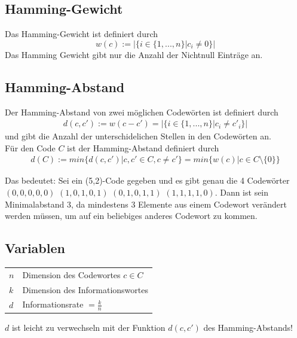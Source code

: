 \documentclass{scrartcl}
\begin{document}
\subsection{Hamming-Gewicht}

\begin{Def}
Das Hamming-Gewicht ist definiert durch
\[
w(c) := \Big| \Big\{ i \in \{ 1,...,n \} \Big| c_i \neq 0 \Big\} \Big|
\]
Das Hamming Gewicht gibt nur die Anzahl der Nichtnull Einträge an.
\end{Def}

\subsection{Hamming-Abstand}
\begin{Def}
Der Hamming-Abstand von zwei möglichen Codewörten ist definiert durch
\begin{align*}
d(c,c') := w(c - c') = \Big| \Big\{ i \in \{ 1, ..., n \} \Big| c_i \neq c'_i \Big\}\Big|
\end{align*}
und gibt die Anzahl der unterschidelichen Stellen in den Codewörten an.\\
Für den Code $C$ ist der Hamming-Abstand definiert durch
\begin{align*}
d(C) := min\Big\{ d(c, c') \Big| c, c' \in C, c \neq c' \Big\} = min \{w(c) | c \in C \setminus \{0\}\}
\end{align*}
\end{Def}

\begin{Beispiel}
Das bedeutet: Sei ein (5,2)-Code gegeben und es gibt genau die 4 Codewörter $(0,0,0,0,0) $ $ (1,0,1,0,1) $ $ (0,1,0,1,1) $ $(1,1,1,1,0)$. Dann ist sein Minimalabstand 3, da mindestens 3 Elemente aus einem Codewort verändert werden müssen, um auf ein beliebiges anderes Codewort zu kommen.
\end{Beispiel}

\subsection{Variablen}
\begin{tabular}{ll}
$n$ & Dimension des Codewortes $c \in C$ \\
$k$ & Dimension des Informationswortes \\
$d$ & Informationsrate $ = \frac{k}{n}$
\end{tabular}

\begin{Warnung}
$d$ ist leicht zu verwechseln mit der Funktion $d(c, c') $ des Hamming-Abstands!
\end{Warnung}
\end{document}
